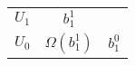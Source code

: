 \documentclass{article}
\begin{document}
\begin{preview}
\begin{tabular}[c]{c| c c}
$U_1$ & $b_1^1$ & \\
$U_0$ & $\Omega(b_1^1)$ &  $b_1^0$
\end{tabular}
\end{preview}
\end{document}
